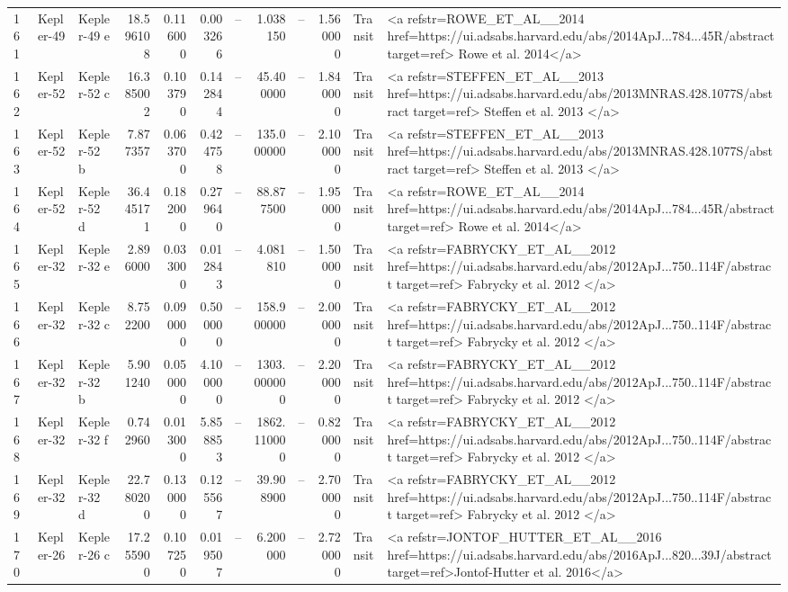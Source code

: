 \begin{tabular}{lllrrrrrrrll}
161 & Kepler-49 & Kepler-49 e & 18.596108 & 0.116000 & 0.003266 & -- & 1.038150 & -- & 1.560000 & Transit & <a refstr=ROWE_ET_AL__2014 href=https://ui.adsabs.harvard.edu/abs/2014ApJ...784...45R/abstract target=ref> Rowe et al. 2014</a> \\
162 & Kepler-52 & Kepler-52 c & 16.385002 & 0.103790 & 0.142844 & -- & 45.400000 & -- & 1.840000 & Transit & <a refstr=STEFFEN_ET_AL__2013 href=https://ui.adsabs.harvard.edu/abs/2013MNRAS.428.1077S/abstract target=ref> Steffen et al. 2013 </a> \\
163 & Kepler-52 & Kepler-52 b & 7.877357 & 0.063700 & 0.424758 & -- & 135.000000 & -- & 2.100000 & Transit & <a refstr=STEFFEN_ET_AL__2013 href=https://ui.adsabs.harvard.edu/abs/2013MNRAS.428.1077S/abstract target=ref> Steffen et al. 2013 </a> \\
164 & Kepler-52 & Kepler-52 d & 36.445171 & 0.182000 & 0.279640 & -- & 88.877500 & -- & 1.950000 & Transit & <a refstr=ROWE_ET_AL__2014 href=https://ui.adsabs.harvard.edu/abs/2014ApJ...784...45R/abstract target=ref> Rowe et al. 2014</a> \\
165 & Kepler-32 & Kepler-32 e & 2.896000 & 0.033000 & 0.012843 & -- & 4.081810 & -- & 1.500000 & Transit & <a refstr=FABRYCKY_ET_AL__2012 href=https://ui.adsabs.harvard.edu/abs/2012ApJ...750..114F/abstract target=ref> Fabrycky et al. 2012 </a> \\
166 & Kepler-32 & Kepler-32 c & 8.752200 & 0.090000 & 0.500000 & -- & 158.900000 & -- & 2.000000 & Transit & <a refstr=FABRYCKY_ET_AL__2012 href=https://ui.adsabs.harvard.edu/abs/2012ApJ...750..114F/abstract target=ref> Fabrycky et al. 2012 </a> \\
167 & Kepler-32 & Kepler-32 b & 5.901240 & 0.050000 & 4.100000 & -- & 1303.000000 & -- & 2.200000 & Transit & <a refstr=FABRYCKY_ET_AL__2012 href=https://ui.adsabs.harvard.edu/abs/2012ApJ...750..114F/abstract target=ref> Fabrycky et al. 2012 </a> \\
168 & Kepler-32 & Kepler-32 f & 0.742960 & 0.013000 & 5.858853 & -- & 1862.110000 & -- & 0.820000 & Transit & <a refstr=FABRYCKY_ET_AL__2012 href=https://ui.adsabs.harvard.edu/abs/2012ApJ...750..114F/abstract target=ref> Fabrycky et al. 2012 </a> \\
169 & Kepler-32 & Kepler-32 d & 22.780200 & 0.130000 & 0.125567 & -- & 39.908900 & -- & 2.700000 & Transit & <a refstr=FABRYCKY_ET_AL__2012 href=https://ui.adsabs.harvard.edu/abs/2012ApJ...750..114F/abstract target=ref> Fabrycky et al. 2012 </a> \\
170 & Kepler-26 & Kepler-26 c & 17.255900 & 0.107250 & 0.019507 & -- & 6.200000 & -- & 2.720000 & Transit & <a refstr=JONTOF_HUTTER_ET_AL__2016 href=https://ui.adsabs.harvard.edu/abs/2016ApJ...820...39J/abstract target=ref>Jontof-Hutter et al. 2016</a> \\

\end{tabular}
